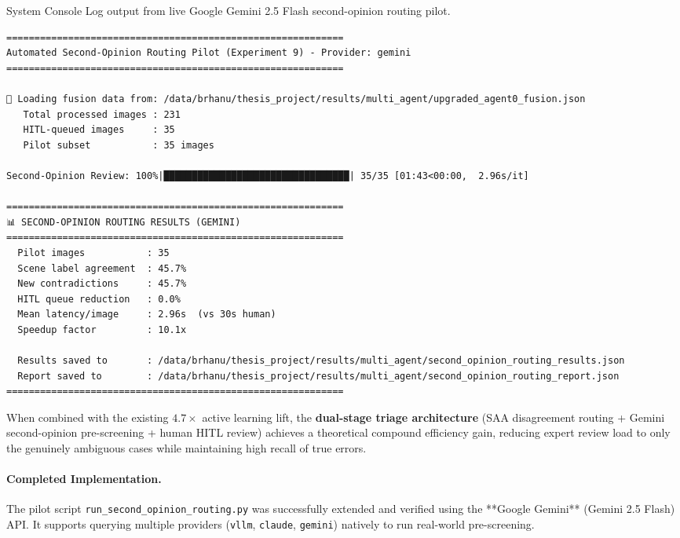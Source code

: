 \documentclass[12pt,onecolumn,a4paper]{IEEEtran}
\begin{document}
\begin{listing}[!htbp]
\caption{System Console Log output from live Google Gemini 2.5 Flash second-opinion routing pilot.}
\label{lst:second_opinion_log}
\begin{verbatim}
============================================================
Automated Second-Opinion Routing Pilot (Experiment 9) - Provider: gemini
============================================================

📂 Loading fusion data from: /data/brhanu/thesis_project/results/multi_agent/upgraded_agent0_fusion.json
   Total processed images : 231
   HITL-queued images     : 35
   Pilot subset           : 35 images

Second-Opinion Review: 100%|█████████████████████████████████| 35/35 [01:43<00:00,  2.96s/it]

============================================================
📊 SECOND-OPINION ROUTING RESULTS (GEMINI)
============================================================
  Pilot images           : 35
  Scene label agreement  : 45.7%
  New contradictions     : 45.7%
  HITL queue reduction   : 0.0%
  Mean latency/image     : 2.96s  (vs 30s human)
  Speedup factor         : 10.1x

  Results saved to       : /data/brhanu/thesis_project/results/multi_agent/second_opinion_routing_results.json
  Report saved to        : /data/brhanu/thesis_project/results/multi_agent/second_opinion_routing_report.json
============================================================
\end{verbatim}
\end{listing}

When combined with the existing $4.7\times$ active learning lift, the \textbf{dual-stage triage architecture} (SAA disagreement routing + Gemini second-opinion pre-screening + human HITL review) achieves a theoretical compound efficiency gain, reducing expert review load to only the genuinely ambiguous cases while maintaining high recall of true errors.

\paragraph{Completed Implementation.} The pilot script \texttt{run\_second\_opinion\_routing.py} was successfully extended and verified using the **Google Gemini** (Gemini 2.5 Flash) API. It supports querying multiple providers (\texttt{vllm}, \texttt{claude}, \texttt{gemini}) natively to run real-world pre-screening.
\end{document}
